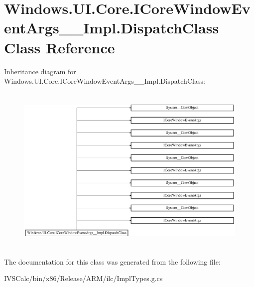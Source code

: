 \hypertarget{class_windows_1_1_u_i_1_1_core_1_1_i_core_window_event_args_____impl_1_1_dispatch_class}{}\section{Windows.\+U\+I.\+Core.\+I\+Core\+Window\+Event\+Args\+\_\+\+\_\+\+Impl.\+Dispatch\+Class Class Reference}
\label{class_windows_1_1_u_i_1_1_core_1_1_i_core_window_event_args_____impl_1_1_dispatch_class}
Inheritance diagram for Windows.\+U\+I.\+Core.\+I\+Core\+Window\+Event\+Args\+\_\+\+\_\+\+Impl.\+Dispatch\+Class\+:\begin{figure}[H]
\begin{center}
\leavevmode
\includegraphics[height=8.213333cm]{class_windows_1_1_u_i_1_1_core_1_1_i_core_window_event_args_____impl_1_1_dispatch_class}
\end{center}
\end{figure}


The documentation for this class was generated from the following file\+:\begin{DoxyCompactItemize}
\item 
I\+V\+S\+Calc/bin/x86/\+Release/\+A\+R\+M/ilc/Impl\+Types.\+g.\+cs\end{DoxyCompactItemize}
